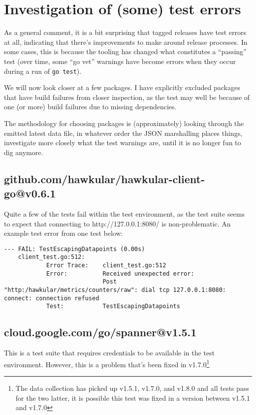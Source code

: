 \documentclass[a4paper]{paper}
\begin{document}
\section{Investigation of (some) test errors}

As a general comment, it is a bit surprising that tagged releases have
test errors at all, indicating that there's improvements to make
around release processes. In some cases, this is because the tooling
has changed what constitutes a ``passing'' test (over time, some ``go
vet'' warnings have become errors when they occur during a run of {\tt go test}).

We will now look closer at a few packages. I have explicitly excluded
packages that have build failures from closer inspection, as the test
may well be because of one (or more) build failures due to missing
dependencies.

The methodology for choosing packages is (approximately) looking
through the emitted latest data file, in whatever order the JSON
marshalling places things, investigate more closely what the test
warnings are, until it is no longer fun to dig anymore.

\subsection{github.com/hawkular/hawkular-client-go@v0.6.1}

Quite a few of the tests fail within the test environment, as the test suite seems to expect that connecting to http://127.0.0.1:8080/ is non-problematic. An example test error from one test below:

\begin{verbatim}
--- FAIL: TestEscapingDatapoints (0.00s)
    client_test.go:512: 
        	Error Trace:	client_test.go:512
        	Error:      	Received unexpected error:
        	            	Post "http:/hawkular/metrics/counters/raw": dial tcp 127.0.0.1:8080: connect: connection refused
        	Test:       	TestEscapingDatapoints
\end{verbatim}

\subsection{cloud.google.com/go/spanner@v1.5.1}

This is a test suite that requires credentials to be available in the
test environment. However, this is a problem that's been fixed in
v1.7.0\footnote{The data collection has picked up v1.5.1, v1.7.0, and
  v1.8.0 and all tests pass for the two latter, it is possible this
  test was fixed in a version between v1.5.1 and v1.7.0}
\end{document}
